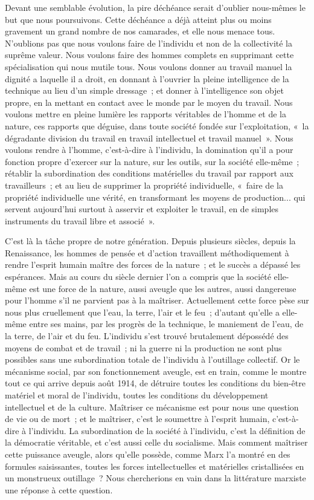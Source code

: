 \documentclass[french,twoside]{book} %
\begin{document}
Devant une semblable évolution, la pire déchéance serait d'oublier nous-mêmes le but que nous poursuivons. Cette déchéance a déjà atteint plus ou moins gravement un grand nombre de nos camarades, et elle nous menace tous. N'oublions pas que nous voulons faire de l'individu et non de la collectivité la suprême valeur. Nous voulons faire des hommes complets en supprimant cette spécialisation qui nous mutile tous. Nous voulons donner au travail manuel la dignité a laquelle il a droit, en donnant à l'ouvrier la pleine intelligence de la technique au lieu d'un simple dressage ; et donner à l'intelligence son objet propre, en la mettant en contact avec le monde par le moyen du travail. Nous voulons mettre en pleine lumière les rapports véritables de l'homme et de la nature, ces rapports que déguise, dans toute société fondée sur l'exploitation, « la dégradante division du travail en travail intellectuel et travail manuel ». Nous voulons rendre à l'homme, c'est-à-dire à l'individu, la domination qu'il a pour fonction propre d'exercer sur la nature, sur les outils, sur la société elle-même ; rétablir la subordination des conditions matérielles du travail par rapport aux travailleurs ; et au lieu de supprimer la propriété individuelle, « faire de la propriété individuelle une vérité, en transformant les moyens de production... qui servent aujourd'hui surtout à asservir et exploiter le travail, en de simples instruments du travail libre et associé ».\par
C'est là la tâche propre de notre génération. Depuis plusieurs siècles, depuis la Renaissance, les hommes de pensée et d'action travaillent méthodiquement à rendre l'esprit humain maître des forces de la nature ; et le succès a dépassé les espérances. Mais au cours du siècle dernier l'on a compris que la société elle-même est une force de la nature, aussi aveugle que les autres, aussi dangereuse pour l'homme s'il ne parvient pas à la maîtriser. Actuellement cette force pèse sur nous plus cruellement que l'eau, la terre, l'air et le feu ; d'autant qu'elle a elle-même entre ses mains, par les progrès de la technique, le maniement de l'eau, de la terre, de l'air et du feu. L'individu s'est trouvé brutalement dépossédé des moyens de combat et de travail ; ni la guerre ni la production ne sont plus possibles sans une subordination totale de l'individu à l'outillage collectif. Or le mécanisme social, par son fonctionnement aveugle, est en train, comme le montre tout ce qui arrive depuis août 1914, de détruire toutes les conditions du bien-être matériel et moral de l'individu, toutes les conditions du développement intellectuel et de la culture. Maîtriser ce mécanisme est pour nous une question de vie ou de mort ; et le maîtriser, c'est le soumettre à l'esprit humain, c'est-à-dire à l'individu. La subordination de la société à l'individu, c'est la définition de la démocratie véritable, et c'est aussi celle du socialisme. Mais comment maîtriser cette puissance aveugle, alors qu'elle possède, comme Marx l'a montré en des formules saisissantes, toutes les forces intellectuelles et matérielles cristallisées en un monstrueux outillage ? Nous chercherions en vain dans la littérature marxiste une réponse à cette question.\par
\end{document}
